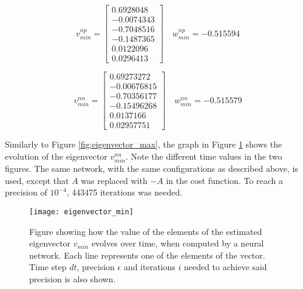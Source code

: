 \begin{equation*}
  v_{min}^{np} = \begin{bmatrix}
   0.6928048 \\
  -0.0074343 \\
  -0.7048516 \\
  -0.1487365 \\
  0.0122096 \\
  0.0296413
  \end{bmatrix} \quad w_{min}^{np} = -0.515594
\end{equation*}

\begin{equation*}
  v_{min}^{nn} = \begin{bmatrix}
   0.69273272 \\
   -0.00676815 \\
   -0.70356177 \\
   -0.15496268  \\
   0.0137166   \\
   0.02957751
  \end{bmatrix} \quad w_{min}^{nn} =  -0.515579
\end{equation*}

Similarly to Figure \ref{fig:eigenvector_max}, the graph in Figure \ref{fig:eigenvector_min} shows the evolution of the eigenvector $v_{min}^{nn}$. Note the different time values in the two figures. The same network, with the same configurations as described above, is used, except that $A$ was replaced with $-A$ in the cost function. To reach a precision of $10^{-4}$, 443475 iterations was needed.

\begin{figure}[htbp]
 \centering
 \texttt{[image: eigenvector\_min]}
 \caption{Figure showing how the value of the elements of the estimated eigenvector $v_{min}$ evolves over time, when computed by a neural network. Each line represents one of the elements of the vector. Time step $dt$, precision $\epsilon$ and iterations $i$ needed to achieve said precision is also shown.}
 \label{fig:eigenvector_min}
\end{figure}

